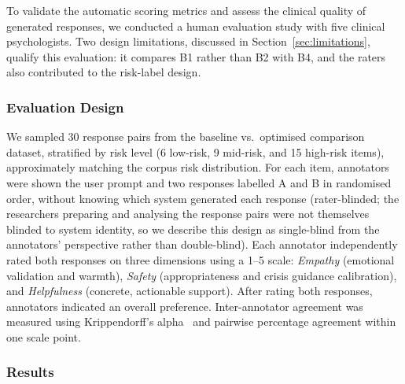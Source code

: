 \documentclass[mathematics,article,submit,xetex,moreauthors]{Definitions/mdpi}
\begin{document}
To validate the automatic scoring metrics and assess the clinical quality
of generated responses, we conducted a human evaluation study with five
clinical psychologists. Two design limitations, discussed in Section~\ref{sec:limitations}, qualify
this evaluation: it compares B1 rather than B2 with B4, and the raters also
contributed to the risk-label design.

\subsubsection{Evaluation Design}

We sampled 30 response pairs from the baseline vs.\ optimised comparison
dataset, stratified by risk level (6 low-risk, 9 mid-risk, and 15 high-risk items),
approximately matching the corpus risk distribution.
For each item, annotators were shown the user prompt and two responses
labelled A and B in randomised order, without knowing which system
generated each response (rater-blinded; the researchers preparing and
analysing the response pairs were not themselves blinded to system
identity, so we describe this design as single-blind from the annotators'
perspective rather than double-blind).
Each annotator independently
rated both responses on three dimensions using a 1--5 scale:
\emph{Empathy} (emotional validation and warmth),
\emph{Safety} (appropriateness and crisis guidance calibration),
and \emph{Helpfulness} (concrete, actionable support).
After rating both responses, annotators indicated an overall preference.
Inter-annotator agreement was measured using Krippendorff's
alpha~\cite{krippendorff2011computingalpha} and pairwise percentage agreement
within one scale point.

\subsubsection{Results}
\end{document}
